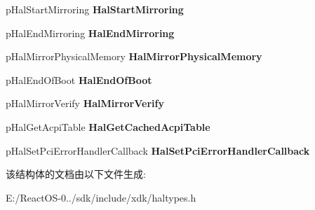 \begin{DoxyCompactItemize}
\mbox{\label{struct_h_a_l___d_i_s_p_a_t_c_h_a253ae2a47bd1a1aa4c5e3c4a96640dd7}} 
p\+Hal\+Start\+Mirroring {\bfseries Hal\+Start\+Mirroring}
\item 
\mbox{\label{struct_h_a_l___d_i_s_p_a_t_c_h_af8c7a51fa2cd8600aff2e24567948781}} 
p\+Hal\+End\+Mirroring {\bfseries Hal\+End\+Mirroring}
\item 
\mbox{\label{struct_h_a_l___d_i_s_p_a_t_c_h_af435e17922f4da6382d2d4e51edd41ce}} 
p\+Hal\+Mirror\+Physical\+Memory {\bfseries Hal\+Mirror\+Physical\+Memory}
\item 
\mbox{\label{struct_h_a_l___d_i_s_p_a_t_c_h_a064e8d86058ae44f56e2caca3ccfe6cd}} 
p\+Hal\+End\+Of\+Boot {\bfseries Hal\+End\+Of\+Boot}
\item 
\mbox{\label{struct_h_a_l___d_i_s_p_a_t_c_h_ac7dd7a50b94957caecdffcd71938af16}} 
p\+Hal\+Mirror\+Verify {\bfseries Hal\+Mirror\+Verify}
\item 
\mbox{\label{struct_h_a_l___d_i_s_p_a_t_c_h_ae849c8af49d18caca473997b47a23975}} 
p\+Hal\+Get\+Acpi\+Table {\bfseries Hal\+Get\+Cached\+Acpi\+Table}
\item 
\mbox{\label{struct_h_a_l___d_i_s_p_a_t_c_h_a3b49ee65e55707178f04dd394d866dab}} 
p\+Hal\+Set\+Pci\+Error\+Handler\+Callback {\bfseries Hal\+Set\+Pci\+Error\+Handler\+Callback}
\end{DoxyCompactItemize}


该结构体的文档由以下文件生成\+:\begin{DoxyCompactItemize}
\item 
E\+:/\+React\+O\+S-\/0../sdk/include/xdk/haltypes.\+h\end{DoxyCompactItemize}
